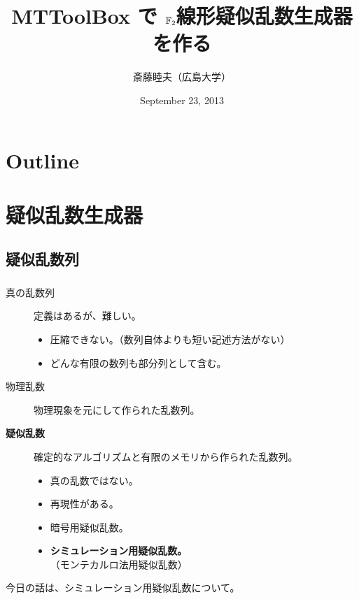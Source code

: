 \documentclass[cjk, dvips, handout, trans, xcolor=dvipsnames]{beamer}
\title[MTToolBox]{MTToolBox で $\F2$線形疑似乱数生成器を作る}
\author{斎藤睦夫（広島大学）}
\date{September 23, 2013}
\def\F2{{\mathbb F}_2}
\begin{document}
\newcommand{\FLPRNG}{$\F2$線形疑似乱数生成器}
\newcommand{\strong}[1]{\textbf{\textcolor{PineGreen}{#1}}}

\section*{Outline}
\begin{frame}[t]
  \tableofcontents
\end{frame}

\section{疑似乱数生成器}
\subsection{疑似乱数列}
\begin{frame}[t]
  \frametitle{\insertsubsection}
  \begin{description}
  \item[真の乱数列] 定義はあるが、難しい。
    \begin{itemize}
      \item 圧縮できない。（数列自体よりも短い記述方法がない）
      \item どんな有限の数列も部分列として含む。
    \end{itemize}
  \item[物理乱数] 物理現象を元にして作られた乱数列。
  \item[\strong{疑似乱数}] 確定的なアルゴリズムと有限のメモリから作られた乱数列。
    \begin{itemize}
    \item 真の乱数ではない。
    \item 再現性がある。
    \item 暗号用疑似乱数。
    \item \strong{シミュレーション用疑似乱数。}\\
      （モンテカルロ法用疑似乱数）
    \end{itemize}
  \end{description}

  \pause
  今日の話は、シミュレーション用疑似乱数について。
\end{frame}
\end{document}
